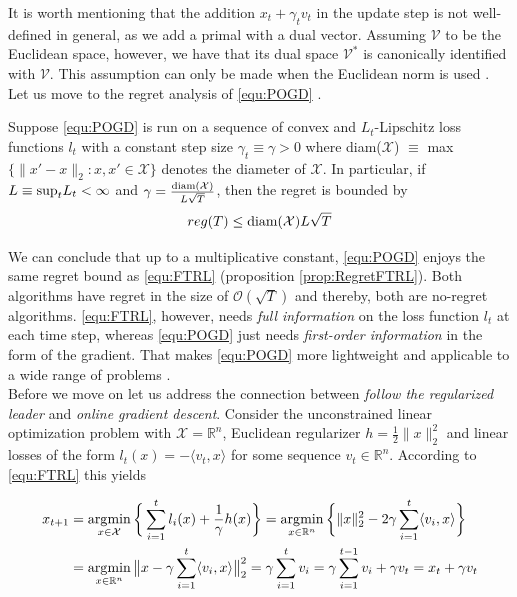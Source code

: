 It is worth mentioning that the addition $x_t + \gamma_t v_t$ in the update step is not well-defined in general, as we add a primal with a dual vector. Assuming $\mathcal{V}$ to be the Euclidean space, however, we have that its dual space $\mathcal{V}^*$ is canonically identified with $\mathcal{V}$. This assumption can only be made when the Euclidean norm is used \cite{HDRmertikopoulos}. Let us move to the regret analysis of \ref{equ:POGD} \cite[Theorem 2.2]{HDRmertikopoulos}.

\begin{proposition}\label{prop:regretPOGD}
    Suppose \ref{equ:POGD} is run on a sequence of convex and $L_t$-Lipschitz loss functions $l_t$ with a constant step size $\gamma_t \equiv \gamma > 0$ where  \textnormal{diam}($\mathcal{X}$) $\equiv$ \textnormal{max}$\{\|x'-x\|_2:x,x' \in \mathcal{X}\}$ denotes the diameter of $\mathcal{X}$. In particular, if $L \equiv \textnormal{sup}_t L_t < \infty$ and $\gamma = \frac{\textnormal{diam}(\mathcal{X})}{L\sqrt{T}}$, then the regret is bounded by 
    \[reg(T) \le \textnormal{diam}(\mathcal{X})L\sqrt{T}\]
\end{proposition}

We can conclude that up to a multiplicative constant, \ref{equ:POGD} enjoys the same regret bound as \ref{equ:FTRL} (proposition \ref{prop:RegretFTRL}). Both algorithms have regret in the size of $\mathcal{O}(\sqrt{T})$ and thereby, both are no-regret algorithms. \ref{equ:FTRL}, however, needs \textit{full information} on the loss function $l_t$ at each time step, whereas \ref{equ:POGD} just needs \textit{first-order information} in the form of the gradient. That makes \ref{equ:POGD} more lightweight and applicable to a wide range of problems \cite{HDRmertikopoulos}. \\

Before we move on let us address the connection between \textit{follow the regularized leader} and \textit{online gradient descent}. Consider the unconstrained linear optimization problem with $\mathcal{X} = \mathbb{R}^n$, Euclidean regularizer $h = \frac{1}{2}\|x\|_2^2$ and linear losses of the form $l_t(x) = -\langle v_t,x\rangle$ for some sequence $v_t \in \mathbb{R}^n$. According to \ref{equ:FTRL} this yields \cite{HDRmertikopoulos}

\begin{equation*}
    \begin{split}
        x_{t+1} & = \operatorname*{\arg\!\min}_{x \in \mathcal{X}} \bigg\{\sum_{i=1}^t l_i(x) + \frac{1}{\gamma}h(x)\bigg\} = \operatorname*{\arg\!\min}_{x \in \mathbb{R}^n} \bigg\{\|x\|_2^2 - 2\gamma\sum_{i=1}^t \langle v_i,x\rangle\bigg\} \\
        & = \operatorname*{\arg\!\min}_{x \in \mathbb{R}^n} \big\|x - \gamma\sum_{i=1}^t \langle v_i,x\rangle\big\|_2^2 = \gamma\sum_{i=1}^t v_i = \gamma\sum_{i=1}^{t-1} v_i + \gamma v_t = x_t + \gamma v_t
    \end{split}
\end{equation*} \\

